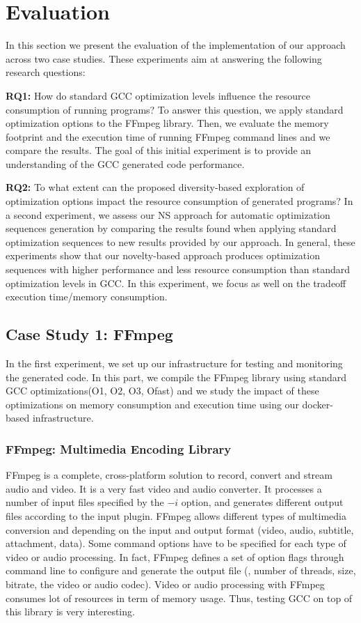 \section{Evaluation}
In this section we present the evaluation of the implementation of our approach across two case studies. 
These experiments aim at answering the following research questions:

\textbf{RQ1:} How do standard GCC optimization levels influence the resource consumption of running programs?
To answer this question, we apply standard optimization options to the FFmpeg library. 
Then, we evaluate the memory footprint and the execution time of running FFmpeg command lines and we compare the results. 
The goal of this initial experiment is to provide an understanding of the GCC generated code  performance.

\textbf{RQ2:} To what extent can the proposed diversity-based exploration of optimization options impact the resource consumption of generated programs?
In a second experiment, we assess our NS
approach for automatic optimization sequences generation by
comparing the results found when applying standard optimization sequences to new
results provided by our approach. 
In general, these experiments show that our novelty-based approach produces optimization sequences with higher performance and less resource consumption
than standard optimization levels in GCC. 
In this experiment, we focus as well on the tradeoff execution time/memory consumption.




\subsection{Case Study 1: FFmpeg}
In the first experiment, we set up our infrastructure for testing and monitoring the generated code. 
In this part, we compile the FFmpeg library using standard GCC optimizations(O1, O2, O3, Ofast) and we study the impact of these optimizations on memory consumption and execution time using our docker-based infrastructure.

\subsubsection{FFmpeg: Multimedia Encoding Library}
FFmpeg is a complete, cross-platform solution to record, convert and stream audio and video. 
It is a very fast video and audio converter. It processes a number of input files specified by the $-i$ option, and generates different output files according to the input plugin. 
FFmpeg allows different types of multimedia conversion and depending on the input and output format (video, audio, subtitle, attachment, data).
Some command options have to be specified for each type of video or audio processing. 
In fact, FFmpeg defines a set of option flags through command line to configure and generate the output
file (\eg, number of threads, size, bitrate, the video or audio codec). 
Video or audio processing with FFmpeg consumes lot of resources in term of memory usage. 
Thus, testing GCC on top of this library is very interesting. 

